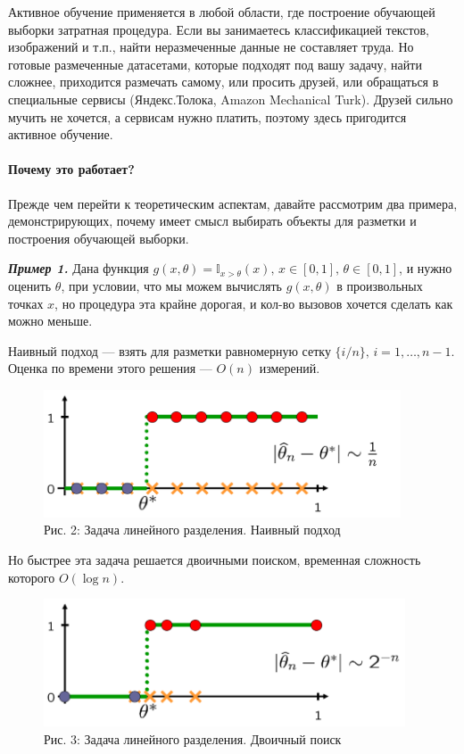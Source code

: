\documentclass[]{article}
\let\oldparagraph\paragraph
\renewcommand{\paragraph}[1]{\oldparagraph{#1}\mbox{}}
\begin{document}
Активное обучение применяется в любой области, где построение обучающей
выборки затратная процедура. Если вы занимаетесь классификацией текстов,
изображений и т.п., найти неразмеченные данные не составляет труда. Но
готовые размеченные датасетами, которые подходят под вашу задачу, найти
сложнее, приходится размечать самому, или просить друзей, или обращаться
в специальные сервисы (Яндекс.Толока, Amazon Mechanical Turk). Друзей
сильно мучить не хочется, а сервисам нужно платить, поэтому здесь
пригодится активное обучение.

\paragraph{Почему это
работает?}\label{ux43fux43eux447ux435ux43cux443-ux44dux442ux43e-ux440ux430ux431ux43eux442ux430ux435ux442}

Прежде чем перейти к теоретическим аспектам, давайте рассмотрим два
примера, демонстрирующих, почему имеет смысл выбирать объекты для
разметки и построения обучающей выборки.

\emph{\textbf{Пример 1.}} Дана функция
\(g(x, \theta) = \mathbb{I}_{x > \theta}(x),\, x \in [0, 1],\, \theta \in [0, 1]\),
и нужно оценить \(\theta\), при условии, что мы можем вычислять
\(g(x, \theta)\) в произвольных точках \(x\), но процедура эта крайне
дорогая, и кол-во вызовов хочется сделать как можно меньше.

Наивный подход --- взять для разметки равномерную сетку
\(\{i/n\},\, i = 1,\ldots, n - 1\). Оценка по времени этого решения ---
\(O(n)\) измерений.

\begin{figure}[htbp]
\centering
\includegraphics[width=4.16667in]{img/naive.png}
\caption{Рис. 2: Задача линейного разделения. Наивный подход}
\end{figure}

Но быстрее эта задача решается двоичными поиском, временная сложность
которого \(O(\log n)\).

\begin{figure}[htbp]
\centering
\includegraphics[width=4.21875in]{img/bs.png}
\caption{Рис. 3: Задача линейного разделения. Двоичный поиск}
\end{figure}
\end{document}
